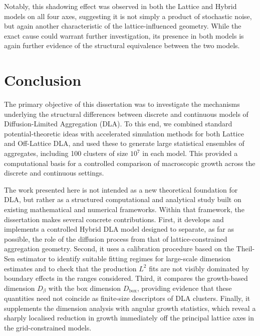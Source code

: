 \documentclass[12pt, a4paper, oneside]{report}
\theoremstyle{remark}
\begin{document}
Notably, this shadowing effect was observed in both the Lattice and Hybrid models on all four axes, suggesting it is not simply a product of stochastic noise, but again another characteristic of the lattice-influenced geometry. While the exact cause could warrant further investigation, its presence in both models is again further evidence of the structural equivalence between the two models. 

\chapter{Conclusion}
\label{ch:conclusion}

The primary objective of this dissertation was to investigate the mechanisms underlying the structural differences between discrete and continuous models of Diffusion-Limited Aggregation (DLA). To this end, we combined standard potential-theoretic ideas with accelerated simulation methods for both Lattice and Off-Lattice DLA, and used these to generate large statistical ensembles of aggregates, including 100 clusters of size $10^7$ in each model. This provided a computational basis for a controlled comparison of macroscopic growth across the discrete and continuous settings.

The work presented here is not intended as a new theoretical foundation for DLA, but rather as a structured computational and analytical study built on existing mathematical and numerical frameworks. Within that framework, the dissertation makes several concrete contributions. First, it develops and implements a controlled Hybrid DLA model designed to separate, as far as possible, the role of the diffusion process from that of lattice-constrained aggregation geometry. Second, it uses a calibration procedure based on the Theil-Sen estimator to identify suitable fitting regimes for large-scale dimension estimates and to check that the production $L^2$ fits are not visibly dominated by boundary effects in the ranges considered. Third, it compares the growth-based dimension $D_\beta$ with the box dimension $D_{\mathrm{box}}$, providing evidence that these quantities need not coincide as finite-size descriptors of DLA clusters. Finally, it supplements the dimension analysis with angular growth statistics, which reveal a sharply localised reduction in growth immediately off the principal lattice axes in the grid-constrained models.
\end{document}
